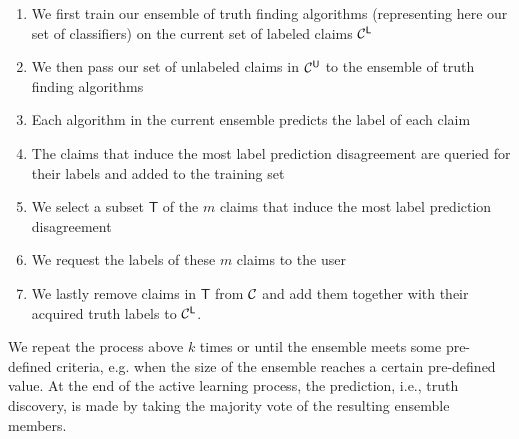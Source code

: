 \begin{enumerate}
 \item We first train our ensemble of truth finding algorithms (representing here our set of classifiers)  on the current set of labeled claims
 $\mathcal{C}^{\mathsf{L}}$ 
 \item We then pass our set of unlabeled claims in $\mathcal{C}^{\mathsf{U}}$ to the ensemble of truth finding algorithms
 \item Each algorithm in the current ensemble predicts the label of each claim
 \item The claims that induce the most label prediction disagreement are queried for their labels and added to the training set
 \item We select a subset $\mathsf{T}$ of the $m$ claims that induce the most label prediction disagreement
 \item We request the labels of these $m$ claims to the user 
 \item We lastly remove claims in $\mathsf{T}$ from $\mathcal{C}$ and add them together with their acquired truth labels to $\mathcal{C}^{\mathsf{L}}$.
\end{enumerate}

We repeat the process above $k$ times or until the ensemble meets some pre-defined criteria, e.g. when the size of the ensemble
reaches a certain pre-defined value. At the end of the active learning process, the prediction, i.e., truth discovery, is made 
by taking the majority vote of the resulting ensemble members. 
